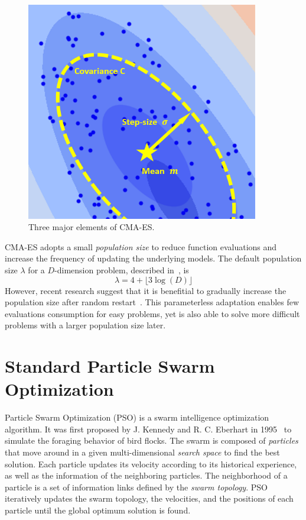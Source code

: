 \begin{figure}
\centering
\includegraphics[width=4in]{CMA_elements}
\caption{Three major elements of CMA-ES.}\label{fig:CMA_elements}
\end{figure}

CMA-ES adopts a small \textit{population size} to reduce function evaluations and increase the frequency of updating the underlying models.
The default population size $\lambda$ for a $D$-dimension problem, described in~\cite{Hansen:2006:CMA_ES_review}, is
\begin{displaymath}
\lambda = 4 + \lfloor 3 \log(D) \rfloor 
\end{displaymath}
However, recent research suggest that it is benefitial to gradually increase the population size after random restart~\cite{Auger:2005:IPOP_CMAES}.
This parameterless adaptation enables few evaluations consumption for easy problems, 
yet is also able to solve more difficult problems with a larger population size later.





\section{Standard Particle Swarm Optimization}

Particle Swarm Optimization (PSO) is a swarm intelligence optimization algorithm. 
It was first proposed by J. Kennedy and R. C. Eberhart in 1995~\cite{Kennedy:1995:PSO} to simulate the foraging behavior of bird flocks.
The swarm is composed of \textit{particles} that move around in a given multi-dimensional \textit{search space} to find the best solution.
Each particle updates its velocity according to its historical experience, as well as the information of the neighboring particles.
The neighborhood of a particle is a set of information links defined by the \textit{swarm topology}. %
PSO iteratively updates the swarm topology, the velocities, and the positions of each particle until the global optimum solution is found.


